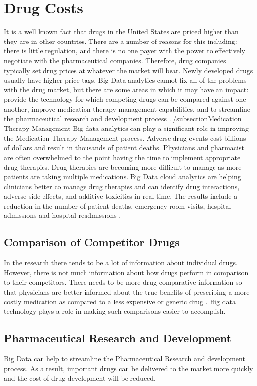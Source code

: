\documentclass[sigconf]{acmart}
\begin{document}
{\section{Drug Costs}
It is a well known fact that drugs in the United States are priced higher than they are in other countries.  There are a number of reasons for this including: there is little regulation, and there is no one payer with the power to effectively negotiate with the pharmaceutical companies. Therefore, drug companies typically set drug prices at whatever the market will bear.  Newly developed drugs usually have higher price tags.  Big Data analytics cannot fix all of the problems with the drug market, but there are some areas in which it may have an impact:  provide the technology for which competing drugs can be compared against one another, improve medication therapy management capabilities, and to streamline the pharmaceutical research and development process \cite{www-google-drug}.
/subsection{Medication Therapy Management}
Big data analytics can play a significant role in improving the Medication Therapy Management process.  Adverse drug events cost billions of dollars and result in thousands of patient deaths.  Physicians and pharmacist are often overwhelmed to the point having the time to implement appropriate drug therapies. Drug therapies are becoming more difficult to manage as more patients are taking multiple medications.  Big Data cloud analytics are helping clinicians better co manage drug therapies and can identify drug interactions, adverse side effects, and additive toxicities in real time. The results include a  reduction in the number of patient deaths, emergency room visits, hospital admissions and hospital readmissions \cite{datafloq}.
\subsection{Comparison of Competitor Drugs}
In the research there tends to be a lot of information about individual drugs. However, there is not much information about how drugs perform in comparison to their competitors.  There needs to be more drug comparative information so that physicians are better informed about the true benefits of prescribing a more costly medication as compared to a less expensive or generic drug \cite{www-google-drug}. Big data technology plays a role in making such comparisons easier to accomplish. 
\subsection{Pharmaceutical Research and Development}
Big Data can help to streamline the Pharmaceutical Research and development process. As a result, important drugs can be delivered to the market more quickly and the cost of drug development will be reduced.

}
\end{document}
